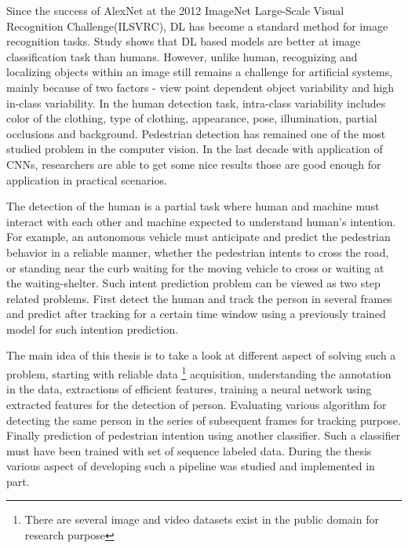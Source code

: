 \newpara Since the success of AlexNet at the 2012 ImageNet Large-Scale Visual Recognition Challenge(ILSVRC), DL has become a standard method for image recognition tasks. Study shows that DL based models are better at image classification task than humans. However, unlike human, recognizing and localizing objects within an image still remains a challenge for artificial 
systems, mainly because of two factors - view point dependent object variability and
high in-class variability. In the human detection task, intra-class variability includes
color of the clothing, type of clothing, appearance, pose, illumination, partial occlusions
and background. Pedestrian detection has remained one of  the most studied problem in the computer vision.
In the last decade with application of CNNs, researchers are able to get some nice results 
those are good enough for application in practical scenarios.

\newpara The detection of the human is a partial task where human and machine must interact 
with each other and machine expected to understand human's intention. For example, 
an autonomous vehicle must anticipate and predict the pedestrian behavior in a reliable manner, whether 
the pedestrian intents to cross the road, or standing near the curb waiting for the moving vehicle to cross or waiting at the waiting-shelter.
Such intent prediction problem can be viewed as two step related problems. First detect the 
human and track the person in several frames and predict after tracking for a certain time window using a previously trained model for such intention prediction.

\newpara The main idea of this thesis is to take a look at different aspect of solving such a problem, 
starting with reliable data \footnote{There are several image and video datasets exist in the 
public domain for research purpose} acquisition, understanding the annotation in the data, extractions of efficient features, training a neural network using extracted features for the detection of person. Evaluating various algorithm for detecting the same person in the series of subsequent frames for tracking purpose. Finally prediction of pedestrian intention using another classifier. Such a classifier must have been trained with set of sequence labeled data. During the thesis various aspect of developing such a pipeline was studied and implemented in part.

